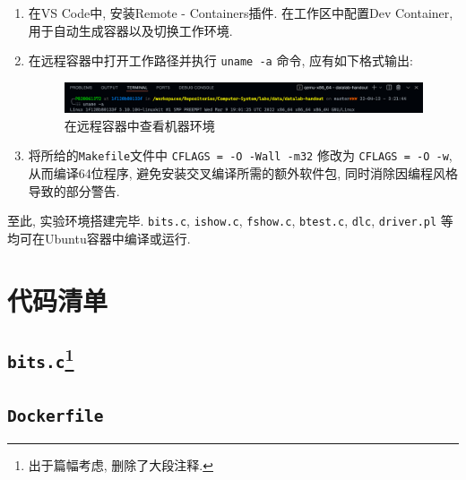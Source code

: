\begin{enumerate}[noitemsep]
\begin{itemize}
    \end{itemize}

    \item 在VS Code中, 安装Remote - Containers插件. 在工作区中配置Dev Container, 用于自动生成容器以及切换工作环境.
    \item 在远程容器中打开工作路径并执行 \verb|uname -a| 命令, 应有如下格式输出: 
    
    \begin{figure}[H]
        \includegraphics[width=\textwidth]{env.png}
        \caption{在远程容器中查看机器环境}
    \end{figure}
    
    \item 将所给的\verb|Makefile|文件中 \verb|CFLAGS = -O -Wall -m32| 修改为 \verb|CFLAGS = -O -w|, 从而编译64位程序, 避免安装交叉编译所需的额外软件包, 同时消除因编程风格导致的部分警告. 

\end{enumerate}

至此, 实验环境搭建完毕. \verb|bits.c|, \verb|ishow.c|, \verb|fshow.c|, \verb|btest.c|, \verb|dlc|, \verb|driver.pl| 等均可在Ubuntu容器中编译或运行.

\clearpage
\section{代码清单}\label{codelist}

\subsection[\texttt{bits.c}]{\texttt{bits.c}\footnote{出于篇幅考虑, 删除了大段注释.}}


\clearpage
\subsection{\texttt{Dockerfile}}

